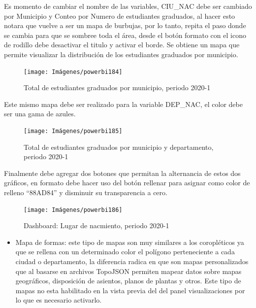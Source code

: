 \documentclass[
]{book}
\providecommand{\tightlist}{%
  \setlength{\itemsep}{0pt}\setlength{\parskip}{0pt}}
\begin{document}
Es momento de cambiar el nombre de las variables, CIU\_NAC debe ser cambiado por Municipio y Conteo por Numero de estudiantes graduados, al hacer esto notara que vuelve a ser un mapa de burbujas, por lo tanto, repita el paso donde se cambia para que se sombree toda el área, desde el botón formato con el icono de rodillo debe desactivar el titulo y activar el borde. Se obtiene un mapa que permite visualizar la distribución de los estudiantes graduados por municipio.

\begin{figure}

{\centering \texttt{[image: Imágenes/powerbi184]} 

}

\caption{Total de estudiantes graduados por municipio, periodo 2020-1}\label{fig:mapaarcgismunicipiosperiodo20201-fig}
\end{figure}

Este mismo mapa debe ser realizado para la variable DEP\_NAC, el color debe ser una gama de azules.

\begin{figure}

{\centering \texttt{[image: Imágenes/powerbi185]} 

}

\caption{Total de estudiantes graduados por municipio y departamento, periodo 2020-1}\label{fig:mapaarcgismunicipiosperiododepartamento20201-fig}
\end{figure}

Finalmente debe agregar dos botones que permitan la alternancia de estos dos gráficos, en formato debe hacer uso del botón rellenar para asignar como color de relleno ``88AD84'' y disminuir su transparencia a cero.

\begin{figure}

{\centering \texttt{[image: Imágenes/powerbi186]} 

}

\caption{Dashboard: Lugar de nacmiento, periodo 2020-1}\label{fig:dashboardlugardenacmiento-fig}
\end{figure}

\begin{itemize}
\tightlist
\item
  Mapa de formas: este tipo de mapas son muy similares a los coropléticos ya que se rellena con un determinado color el polígono perteneciente a cada ciudad o departamento, la diferencia radica en que son mapas personalizados que al basarse en archivos TopoJSON permiten mapear datos sobre mapas geográficos, disposición de asientos, planos de plantas y otros. Este tipo de mapas no esta habilitado en la vista previa del del panel visualizaciones por lo que es necesario activarlo.
\end{itemize}
\end{document}
